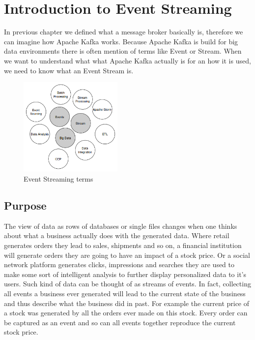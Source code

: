 \chapter{Introduction to Event Streaming}

In previous chapter we defined what a message broker basically is, therefore we
can imagine how Apache Kafka works. Because Apache Kafka is build for big data
environments  there is often mention of terms like Event or
Stream. When we want to understand what what Apache Kafka actually is for an
how it is used, we need to know what an Event Stream is.

\begin{figure}[H]
    \centering
    \includegraphics[width=0.45\textwidth]{images/evenstreaming-intro.png}
    \caption{Event Streaming terms}
    \label{fig:evenstreaming-intro}
\end{figure}

\section{Purpose}
The view of data as rows of databases or single files changes when one thinks
about what a business actually does with the generated data. Where retail
generates orders they lead to sales, shipments and so on, a financial institution will
generate orders they are going to have an impact of a stock price. Or a social
network platform generates clicks, impressions and searches they are used to
make some sort of intelligent analysis to further display personalized data to
it's users. Such kind of data can be thought of as streams of
events. In fact, collecting all events a business ever generated will lead to the current state
of the business and thus describe what the business did in past. For example the
current price of a stock was generated by all the orders ever made on this
stock. Every order can be captured as an event and so can all events together reproduce
the current stock price.

